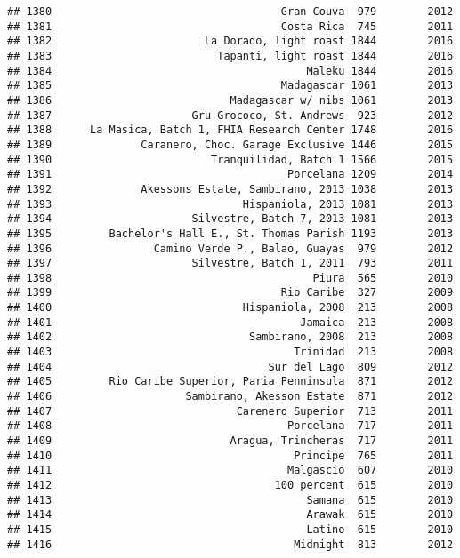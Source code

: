 \documentclass[
]{article}
\begin{document}
\begin{verbatim}
## 1380                                    Gran Couva  979        2012
## 1381                                    Costa Rica  745        2011
## 1382                        La Dorado, light roast 1844        2016
## 1383                          Tapanti, light roast 1844        2016
## 1384                                        Maleku 1844        2016
## 1385                                    Madagascar 1061        2013
## 1386                            Madagascar w/ nibs 1061        2013
## 1387                      Gru Grococo, St. Andrews  923        2012
## 1388      La Masica, Batch 1, FHIA Research Center 1748        2016
## 1389              Caranero, Choc. Garage Exclusive 1446        2015
## 1390                         Tranquilidad, Batch 1 1566        2015
## 1391                                     Porcelana 1209        2014
## 1392              Akessons Estate, Sambirano, 2013 1038        2013
## 1393                              Hispaniola, 2013 1081        2013
## 1394                      Silvestre, Batch 7, 2013 1081        2013
## 1395         Bachelor's Hall E., St. Thomas Parish 1193        2013
## 1396                Camino Verde P., Balao, Guayas  979        2012
## 1397                      Silvestre, Batch 1, 2011  793        2011
## 1398                                         Piura  565        2010
## 1399                                    Rio Caribe  327        2009
## 1400                              Hispaniola, 2008  213        2008
## 1401                                       Jamaica  213        2008
## 1402                               Sambirano, 2008  213        2008
## 1403                                      Trinidad  213        2008
## 1404                                  Sur del Lago  809        2012
## 1405         Rio Caribe Superior, Paria Penninsula  871        2012
## 1406                     Sambirano, Akesson Estate  871        2012
## 1407                             Carenero Superior  713        2011
## 1408                                     Porcelana  717        2011
## 1409                            Aragua, Trincheras  717        2011
## 1410                                      Principe  765        2011
## 1411                                     Malgascio  607        2010
## 1412                                   100 percent  615        2010
## 1413                                        Samana  615        2010
## 1414                                        Arawak  615        2010
## 1415                                        Latino  615        2010
## 1416                                      Midnight  813        2012

\end{verbatim}
\end{document}
